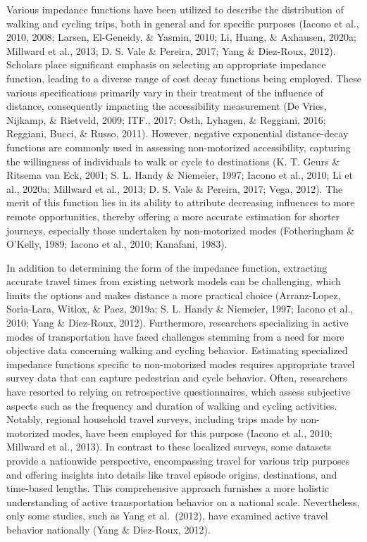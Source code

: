 \documentclass[
11pt, %
oneside, %
english, %
singlespacing, %
]{macthesis} %
\begin{document}
Various impedance functions have been utilized to describe the distribution of walking and cycling trips, both in general and for specific purposes (Iacono et al., 2010, 2008; Larsen, El-Geneidy, \& Yasmin, 2010; Li, Huang, \& Axhausen, 2020a; Millward et al., 2013; D. S. Vale \& Pereira, 2017; Yang \& Diez-Roux, 2012). Scholars place significant emphasis on selecting an appropriate impedance function, leading to a diverse range of cost decay functions being employed. These various specifications primarily vary in their treatment of the influence of distance, consequently impacting the accessibility measurement (De Vries, Nijkamp, \& Rietveld, 2009; ITF., 2017; Osth, Lyhagen, \& Reggiani, 2016; Reggiani, Bucci, \& Russo, 2011). However, negative exponential distance-decay functions are commonly used in assessing non-motorized accessibility, capturing the willingness of individuals to walk or cycle to destinations (K. T. Geurs \& Ritsema van Eck, 2001; S. L. Handy \& Niemeier, 1997; Iacono et al., 2010; Li et al., 2020a; Millward et al., 2013; D. S. Vale \& Pereira, 2017; Vega, 2012). The merit of this function lies in its ability to attribute decreasing influences to more remote opportunities, thereby offering a more accurate estimation for shorter journeys, especially those undertaken by non-motorized modes (Fotheringham \& O'Kelly, 1989; Iacono et al., 2010; Kanafani, 1983).

In addition to determining the form of the impedance function, extracting accurate travel times from existing network models can be challenging, which limits the options and makes distance a more practical choice (Arranz-Lopez, Soria-Lara, Witlox, \& Paez, 2019a; S. L. Handy \& Niemeier, 1997; Iacono et al., 2010; Yang \& Diez-Roux, 2012). Furthermore, researchers specializing in active modes of transportation have faced challenges stemming from a need for more objective data concerning walking and cycling behavior. Estimating specialized impedance functions specific to non-motorized modes requires appropriate travel survey data that can capture pedestrian and cycle behavior. Often, researchers have resorted to relying on retrospective questionnaires, which assess subjective aspects such as the frequency and duration of walking and cycling activities. Notably, regional household travel surveys, including trips made by non-motorized modes, have been employed for this purpose (Iacono et al., 2010; Millward et al., 2013). In contrast to these localized surveys, some datasets provide a nationwide perspective, encompassing travel for various trip purposes and offering insights into details like travel episode origins, destinations, and time-based lengths. This comprehensive approach furnishes a more holistic understanding of active transportation behavior on a national scale. Nevertheless, only some studies, such as Yang et al.~(2012), have examined active travel behavior nationally (Yang \& Diez-Roux, 2012).
\end{document}
